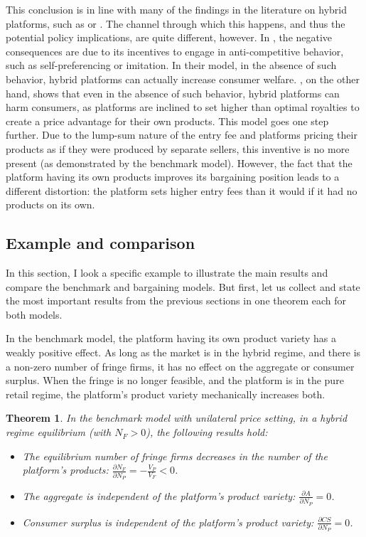 \documentclass[a4paper]{article}
\newtheorem{theorem}{Theorem}
\begin{document}
This conclusion is in line with many of the findings in the literature on hybrid platforms, such as \textcite{hagiu2022should} or \textcite{anderson2021hybrid}.
The channel through which this happens, and thus the potential policy implications, are quite different, however.
In \textcite{hagiu2022should}, the negative consequences are due to its incentives to engage in anti-competitive behavior, such as self-preferencing or imitation.
In their model, in the absence of such behavior, hybrid platforms can actually increase consumer welfare.
\textcite{anderson2021hybrid}, on the other hand, shows that even in the absence of such behavior, hybrid platforms can harm consumers, as platforms are inclined to set higher than optimal royalties to create a price advantage for their own products.
This model goes one step further.
Due to the lump-sum nature of the entry fee and platforms pricing their products as if they were produced by separate sellers, this inventive is no more present (as demonstrated by the benchmark model).
However, the fact that the platform having its own products improves its bargaining position leads to a different distortion: the platform sets higher entry fees than it would if it had no products on its own.

\subsection{Example and comparison}

In this section, I look a specific example to illustrate the main results and compare the benchmark and bargaining models.
But first, let us collect and state the most important results from the previous sections in one theorem each for both models.

In the benchmark model, the platform having its own product variety has a weakly positive effect.
As long as the market is in the hybrid regime, and there is a non-zero number of fringe firms, it has no effect on the aggregate or consumer surplus.
When the fringe is no longer feasible, and the platform is in the pure retail regime, the platform's product variety mechanically increases both.
\begin{theorem}
    \label{prop:benchmark_results}
    In the benchmark model with unilateral price setting, in a hybrid regime equilibrium (with $N_F > 0$), the following results hold:
    \begin{itemize}
        \item The equilibrium number of fringe firms decreases in the number of the platform's products: $\frac{\partial N_F}{\partial N_P} = -\frac{V_P}{V_F} < 0$.
        \item The aggregate is independent of the platform's product variety: $\frac{\partial A}{\partial N_P} = 0$.
        \item Consumer surplus is independent of the platform's product variety: $\frac{\partial CS}{\partial N_P} = 0$.
    \end{itemize}
\end{theorem}
\end{document}
